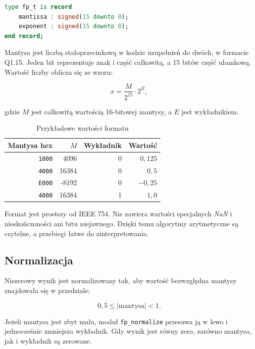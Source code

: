 \documentclass[12pt,a4paper]{article}
\begin{document}
\begin{lstlisting}[language=VHDL,caption={Format liczby używany w projekcie}]
type fp_t is record
    mantissa : signed(15 downto 0);
    exponent : signed(15 downto 0);
end record;
\end{lstlisting}

Mantysa jest liczbą stałoprzecinkową w kodzie uzupełnień do dwóch,
w formacie Q1.15. Jeden bit reprezentuje znak i część całkowitą, a 15 bitów
część ułamkową. Wartość liczby oblicza się ze wzoru:

\begin{equation}
    x = \frac{M}{2^{15}} \cdot 2^E,
\end{equation}

gdzie \(M\) jest całkowitą wartością 16-bitowej mantysy, a \(E\) jest
wykładnikiem.

\begin{table}[H]
    \centering
    \caption{Przykładowe wartości formatu}
    \begin{tabular}{rrrr}
        \toprule
        Mantysa hex & \(M\) & Wykładnik & Wartość \\
        \midrule
        \texttt{1000} & 4096 & 0 & \(0{,}125\) \\
        \texttt{4000} & 16384 & 0 & \(0{,}5\) \\
        \texttt{E000} & -8192 & 0 & \(-0{,}25\) \\
        \texttt{4000} & 16384 & 1 & \(1{,}0\) \\
        \bottomrule
    \end{tabular}
\end{table}

Format jest prostszy od IEEE 754. Nie zawiera wartości specjalnych
\textit{NaN} i nieskończoności ani bitu niejawnego. Dzięki temu algorytmy
arytmetyczne są czytelne, a przebiegi łatwe do zinterpretowania.

\subsection{Normalizacja}

Niezerowy wynik jest normalizowany tak, aby wartość bezwzględna mantysy
znajdowała się w przedziale:

\begin{equation}
    0{,}5 \leq |\text{mantysa}| < 1.
\end{equation}

Jeżeli mantysa jest zbyt mała, moduł \texttt{fp\_normalize} przesuwa ją
w lewo i jednocześnie zmniejsza wykładnik. Gdy wynik jest równy zero,
zarówno mantysa, jak i wykładnik są zerowane.
\end{document}
